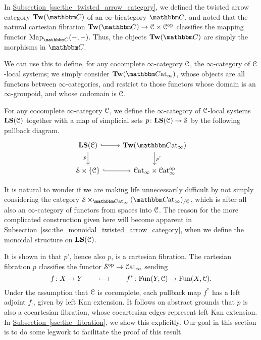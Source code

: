 \documentclass[main.tex]{subfiles}
\begin{document}
In \hyperref[ssc:the_twisted_arrow_category]{Subsection~\ref*{ssc:the_twisted_arrow_category}}, we defined the twisted arrow category $\Tw(\CC)$ of an $\infty$-bicategory $\CC$, and noted that the natural cartesian fibration $\Tw(\CC) \to \category{C} \times \category{C}\op$ classifies the mapping functor $\Map_{\CC}(-, -)$. Thus, the objects $\Tw(\CC)$ are simply the morphisms in $\CC$.

We can use this to define, for any cocomplete $\infty$-category $\mathcal{C}$, the $\infty$-category of $\mathcal{C}$-local systems; we simply consider $\Tw(\ICCat)$, whose objects are all functors between $\infty$-categories, and restrict to those functors whose domain is an $\infty$-groupoid, and whose codomain is $\mathcal{C}$.

\begin{definition}
  For any cocomplete $\infty$-category $\mathcal{C}$, we define the $\infty$-category of $\mathcal{C}$-local systems $\mathbf{LS}(\mathcal{C})$ together with a map of simplicial sets $p\colon \mathbf{LS}(\mathcal{C}) \to \mathcal{S}$ by the following pullback diagram.
  \begin{equation}
    \label{eq:pullback_square_defining_local_systems}
    \begin{tikzcd}
      \LS(\category{C})
      \arrow[r, hook]
      \arrow[d, swap, "p"]
      & \Tw(\ICCat)
      \arrow[d, "p'"]
      \\
      \S \times \{\category{C}\}
      \arrow[r, hook]
      & \ICat \times \ICat\op
    \end{tikzcd}
  \end{equation}
\end{definition}

\begin{note}
  It is natural to wonder if we are making life unnecessarily difficult by not simply considering the category $\S \times_{\ICCat}(\ICCat)_{/\category{C}}$, which is after all also an $\infty$-category of functors from spaces into $\mathcal{C}$. The reason for the more complicated construction given here will become apparent in \hyperref[ssc:the_monoidal_twisted_arrow_category]{Subsection~\ref*{ssc:the_monoidal_twisted_arrow_category}}, when we define the monoidal structure on $\mathbf{LS}(\mathcal{C})$.
\end{note}

It is shown in \cite{garcia2020enhanced} that $p'$, hence also $p$, is a cartesian fibration. The cartesian fibration $p$ classifies the functor $\mathcal{S}^{\mathrm{op}} \to \mathcal{C}\mathrm{at}_{\infty}$ sending
\begin{equation*}
  f\colon X \to Y \qquad \longmapsto \qquad f^{*}\colon \mathrm{Fun}(Y, \mathcal{C}) \to \mathrm{Fun}(X, \mathcal{C}).
\end{equation*}
Under the assumption that $\mathcal{C}$ is cocomplete, each pullback map $f^{*}$ has a left adjoint $f_{!}$, given by left Kan extension. It follows on abstract grounds that $p$ is also a cocartesian fibration, whose cocartesian edges represent left Kan extension. In \hyperref[ssc:the_fibration]{Subsection~\ref*{ssc:the_fibration}}, we show this explicitly. Our goal in this section is to do some legwork to facilitate the proof of this result.
\end{document}
